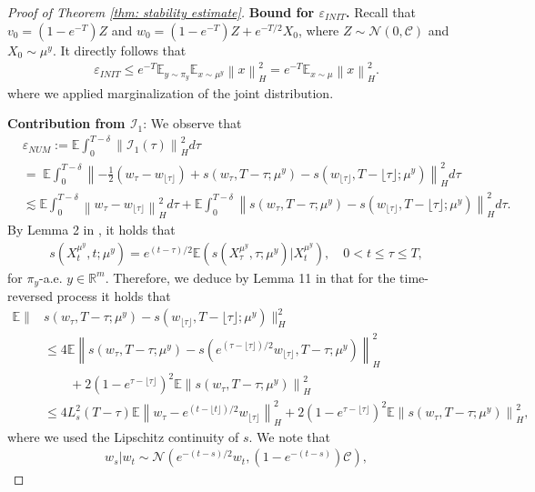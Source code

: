 \documentclass[10pt]{article} %
\newcommand{\E}{\mathbb{E}}
\newcommand{\R}{\mathbb{R}}
\theoremstyle{plain}
\theoremstyle{definition}
\theoremstyle{remark}
\newcommand{\norm}[1]{\left\|#1\right\|}
\newcommand{\C}{\mathcal C}
\newcommand{\N}{\mathcal N}
\newcommand{\low}[1]{{\lfloor #1 \rfloor}}
\begin{document}
\begin{proof}[Proof of Theorem \ref{thm: stability estimate}]
{\bf Bound for $\varepsilon_{INIT}$.} Recall that $v_0 =  (1-e^{-T}) Z$ and $w_0 = (1-e^{-T}) Z + e^{-T/2} X_0$, where $Z \sim \N(0,\C)$ and $X_0\sim \mu^y$. It directly follows that
\begin{eqnarray*}
    \varepsilon_{INIT} \leq  e^{-T} \E_{y\sim\pi_y}\E_{x\sim \mu^y} \norm{x}_H^2 = e^{-T} \E_{x\sim \mu} \norm{x}_H^2.
\end{eqnarray*}
where we applied marginalization of the joint distribution.

{\bf Contribution from ${\mathcal I_1}$}: We observe that
\begin{align*}
    & \varepsilon_{NUM} := \E \int_0^{T-\delta} \norm{{\mathcal I}_1(\tau)}_H^2 d\tau \\
    & = \;\E \int_0^{T-\delta} \norm{-\frac 12 \left(w_\tau - w_{\low\tau}\right) +
	s(w_\tau, T-\tau; \mu^y)- s(w_{\low\tau}, T-\low \tau; \mu^y)}_H^2 d \tau \\
    & \lesssim \E \int_0^{T-\delta} \norm{w_\tau - w_{\low\tau}}_H^2 d\tau + \E \int_0^{T-\delta} \norm{s(w_\tau, T-\tau; \mu^y)- s(w_{\low\tau}, T-\low \tau; \mu^y)}_H^2 d\tau.
\end{align*}
By Lemma 2 in \citet{pidstrigach2023infinitedimensional}, it holds that
\begin{eqnarray*}
    s(X_t^{\mu^y}, t; \mu^y) = e^{(t- \tau)/2}\E\left( s(X_\tau^{\mu^y}, \tau; \mu^y) | X_t^{\mu^y}\right), \quad 0 < t \le \tau \le T,
\end{eqnarray*}
for $\pi_y$-a.e. $y\in\R^m$. Therefore, we deduce by Lemma 11 in \citet{chen2023improved} that for the time-reversed process it holds that
\begin{align*}
     \E \big\|& s(w_\tau, T-\tau; \mu^y)   - s(w_{\low\tau}, T-\low{\tau}; \mu^y)\big\|_H^2  \\
     & \le 4 \E \norm{s(w_\tau, T-\tau; \mu^y) - s( e^{(\tau - \low{\tau})/2}w_{\low\tau}, T- \tau; \mu^y)}_H^2 \\
     & \quad\quad+ 2 \left(1-e^{\tau - \low{\tau}}\right)^2 \E \norm{s(w_\tau, T-\tau; \mu^y)}_H^2 \\
     & \leq 4 L_s^2(T-\tau) \E \norm{w_\tau- e^{(t - \low{t}) / 2}w_{\low{\tau}}}_H^2 + 2(1-e^{\tau - \low{\tau}})^2 \E \norm{s(w_\tau, T - \tau; \mu^y)}_H^2,
\end{align*}
where we used the Lipschitz continuity of $s$.
We note that 
\begin{eqnarray}\label{eq: transition kernel ou process}
     w_s | w_t \sim \N\left(e^{-(t - s)/2} w_t, (1-e^{-(t - s)} ) \C\right),
\end{eqnarray}

\end{proof}
\end{document}
